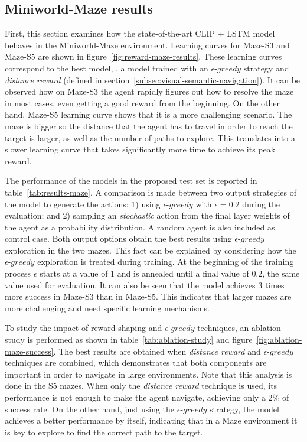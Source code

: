 \subsection{Miniworld-Maze results}\label{subsec:miniworld-maze-results}

First, this section examines how the state-of-the-art CLIP + LSTM model behaves in the Miniworld-Maze environment.
Learning curves for Maze-S3 and Maze-S5 are shown in figure~\ref{fig:reward-maze-results}.
These learning curves correspond to the best model, \ie, a model trained with an $\epsilon\text{-}greedy$ strategy and \textit{distance reward} (defined in section~\ref{subsec:visual-semantic-navigation}).
It can be observed how on Maze-S3 the agent rapidly figures out how to resolve the maze in most cases, even getting a good reward from the beginning.
On the other hand, Maze-S5 learning curve shows that it is a more challenging scenario.
The maze is bigger so the distance that the agent has to travel in order to reach the target is larger, as well as the number of paths to explore.
This translates into a slower learning curve that takes significantly more time to achieve its peak reward.


The performance of the models in the proposed test set is reported in table~\ref{tab:results-maze}.
A comparison is made between two output strategies of the model to generate the actions:
1) using $\epsilon\text{-}greedy$ with $\epsilon=0.2$ during the evaluation;
and 2) sampling an \textit{stochastic} action from the final layer weights of the agent as a probability distribution.
A random agent is also included as control case.
Both output options obtain the best results using $\epsilon\text{-}greedy$ exploration in the two mazes.
This fact can be explained by considering how the $\epsilon\text{-}greedy$ exploration is treated during training.
At the beginning of the training process $\epsilon$ starts at a value of $1$ and is annealed until a final value of $0.2$, the same value used for evaluation.
It can also be seen that the model achieves 3 times more success in Maze-S3 than in Maze-S5.
This indicates that larger mazes are more challenging and need specific learning mechanisms.

To study the impact of reward shaping and $\epsilon\text{-}greedy$ techniques, an ablation study is performed as shown in table~\ref{tab:ablation-study} and figure~\ref{fig:ablation-maze-success}.
The best results are obtained when \textit{distance reward} and $\epsilon\text{-}greedy$ techniques are combined, which demonstrates that both components are important in order to navigate in large environments.
Note that this analysis is done in the S5 mazes.
When only the \textit{distance reward} technique is used, its performance is not enough to make the agent navigate, achieving only a 2\% of success rate.
On the other hand, just using the $\epsilon\text{-}greedy$ strategy, the model achieves a better performance by itself, indicating that in a Maze environment it is key to explore to find the correct path to the target.

